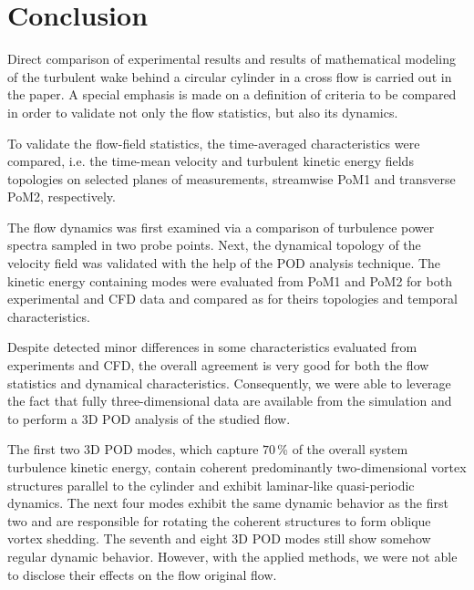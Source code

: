 \section{Conclusion}
\label{sec:concl}
Direct comparison of experimental results and results of mathematical modeling of the turbulent wake behind a circular cylinder {in a cross flow} is carried out in the paper. {A special emphasis is made on a definition of criteria to be compared in order to validate not only the flow statistics, but also its dynamics.}

{To validate the flow-field statistics,} the {time-}averaged characteristics were compared, i.e. {the} time-mean velocity {and turbulent kinetic energy} field{s} topolog{ies} {on selected planes of measurements, streamwise PoM1 and transverse PoM2, respectively.}


{The flow dynamics was first examined via a comparison of turbulence power spectra sampled in two probe points. Next,} the dynamical topology of the velocity field was validated with {the} help of {the} POD analysis technique. The kinetic energy containing modes were evaluated {from PoM1 and PoM2 for} both experimental and CFD data and compared as for theirs topologies {and temporal characteristics}.%

{Despite detected} minor differences in some characteristics evaluated from experiments and CFD, {the} overall agreement is very good for {both the flow} statistics and dynamical characteristics. {Consequently, we were able to leverage the fact that fully three-dimensional data are available from the simulation and to perform a 3D POD analysis of the studied flow.}

{The first two 3D POD modes, which capture $70\,$\% of the overall system turbulence kinetic energy, contain coherent predominantly two-dimensional vortex structures parallel to the cylinder and exhibit laminar-like quasi-periodic dynamics. The next four modes exhibit the same dynamic behavior as the first two and are responsible for rotating the coherent structures to form oblique vortex shedding. The seventh and eight 3D POD modes still show somehow regular dynamic behavior. However, with the applied methods, we were not able to disclose their effects on the flow original flow.}

